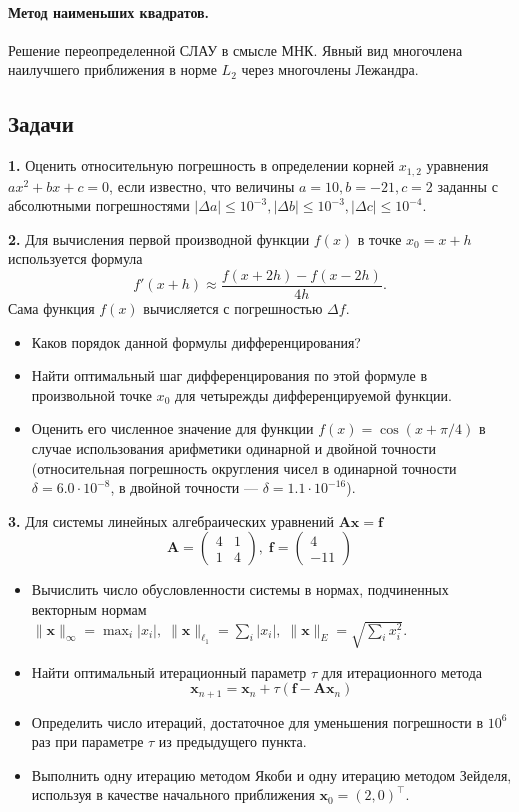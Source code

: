 \documentclass[12pt]{article}
\renewcommand{\vec}[1]{\boldsymbol{\mathbf{#1}}}
\renewcommand{\leq}{\leqslant}
\begin{document}
\paragraph{Метод наименьших квадратов.} Решение переопределенной СЛАУ в смысле МНК. Явный вид многочлена наилучшего приближения в норме $L_2$ через многочлены Лежандра.

\subsection{Задачи}
\textbf{1.} Оценить относительную погрешность в определении корней $x_{1,2}$ уравнения $ax^2 + bx + c = 0$, если известно, что величины $a = 10, b = -21, c = 2$ заданны с абсолютными погрешностями 
$|\Delta a| \leq 10^{-3}, |\Delta b| \leq 10^{-3}, |\Delta c| \leq 10^{-4}$.

\textbf{2.} 
Для вычисления первой производной функции $f(x)$ в точке $x_0 = x+h$ используется формула
\[
f'(x + h) \approx \frac{f(x+2h) - f(x-2h)}{4h}.
\]
Сама функция $f(x)$ вычисляется с погрешностью $\Delta f$.
\begin{itemize}
\item Каков порядок данной формулы дифференцирования?
\item Найти оптимальный шаг дифференцирования по этой формуле в произвольной точке $x_0$ для четырежды дифференцируемой функции.
\item Оценить его численное значение для функции $f(x)=\cos(x+\pi/4)$ в случае использования арифметики одинарной и двойной точности (относительная погрешность округления чисел в одинарной точности $\delta = 6.0\cdot 10^{-8}$, в двойной точности --- $\delta = 1.1\cdot 10^{-16}$).
\end{itemize}

\textbf{3.}
Для системы линейных алгебраических уравнений $\vec {Ax} = \vec f$
\[
\vec A = \begin{pmatrix}
4 & 1\\1 & 4
\end{pmatrix}, \; \vec f = \begin{pmatrix}
4 \\ -11
\end{pmatrix}
\]
\begin{itemize}
\item Вычислить число обусловленности системы в нормах, подчиненных векторным нормам $\|\vec x\|_\infty = \max_i |x_i|,\; \|\vec x\|_{\ell_1} = \sum_i |x_i|,\; \|\vec x\|_E = \sqrt{\sum_i x_i^2}$.
\item Найти оптимальный итерационный параметр $\tau$ для итерационного метода
\[
\vec x_{n+1} = \vec x_n + \tau (\vec f - \vec {Ax}_n)
\]
\item Определить число итераций, достаточное для уменьшения погрешности в $10^6$ раз при параметре $\tau$ из предыдущего пункта.
\item Выполнить одну итерацию методом Якоби и одну итерацию методом Зейделя, используя в качестве начального приближения $\vec x_0 = (2, 0)^\top$.
\end{itemize}
\end{document}
